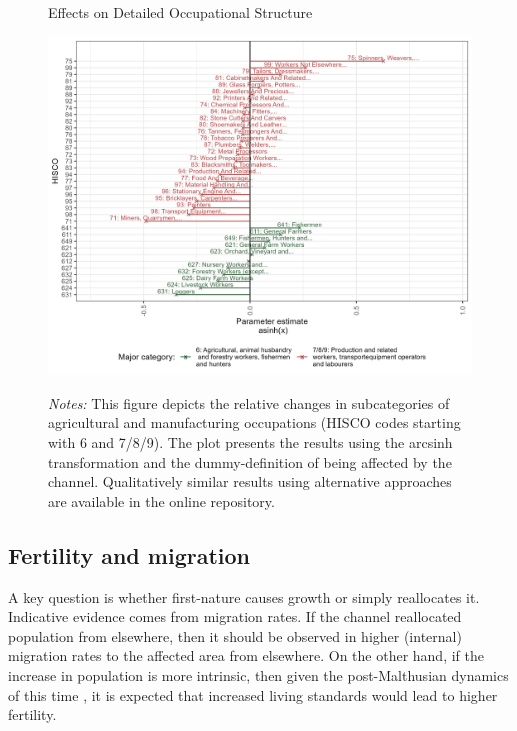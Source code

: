 \documentclass[11pt]{article}
\begin{document}
\begin{figure}
\begin{center}
  \caption{Effects on Detailed Occupational Structure} \label{fig:mech_occ2}
  \includegraphics[width=1\textwidth]{Plots/Mechanism/Detailed6789/Dummy_asi.png}
  \parbox{0.9\textwidth}{
  \caption*{\footnotesize \textit{Notes:} This figure depicts the relative changes in subcategories of agricultural and manufacturing occupations (HISCO codes starting with 6 and 7/8/9). The plot presents the results using the arcsinh transformation and the dummy-definition of being affected by the channel. Qualitatively similar results using alternative approaches are available in the online repository.}
}
\end{center}
\end{figure}
\FloatBarrier


\FloatBarrier
\subsection{Fertility and migration}
A key question is whether first-nature causes growth or simply reallocates it. Indicative evidence comes from migration rates. If the channel reallocated population from elsewhere, then it should be observed in higher (internal) migration rates to the affected area from elsewhere. On the other hand, if the increase in population is more intrinsic, then given the post-Malthusian dynamics of this time \citep{Jensen2022, Klemp2016}, it is expected that increased living standards would lead to higher fertility.
\end{document}
